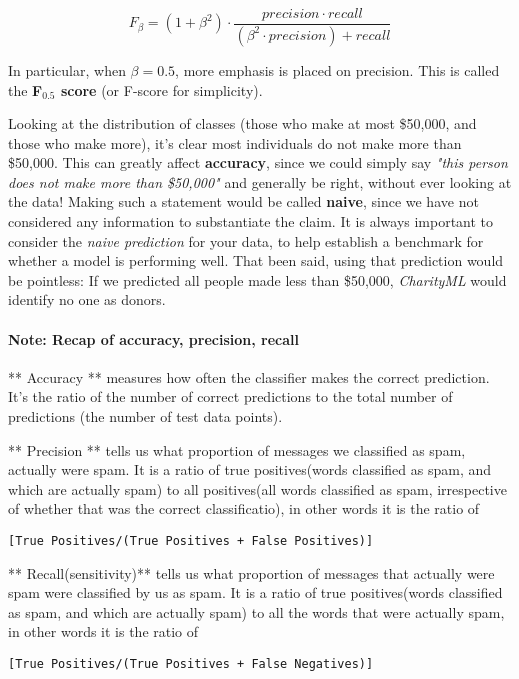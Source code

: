 \documentclass[11pt]{article}
\begin{document}
\[ F_{\beta} = (1 + \beta^2) \cdot \frac{precision \cdot recall}{\left( \beta^2 \cdot precision \right) + recall} \]

In particular, when \(\beta = 0.5\), more emphasis is placed on
precision. This is called the \textbf{F\(_{0.5}\) score} (or F-score for
simplicity).

Looking at the distribution of classes (those who make at most \$50,000,
and those who make more), it's clear most individuals do not make more
than \$50,000. This can greatly affect \textbf{accuracy}, since we could
simply say \emph{"this person does not make more than \$50,000"} and
generally be right, without ever looking at the data! Making such a
statement would be called \textbf{naive}, since we have not considered
any information to substantiate the claim. It is always important to
consider the \emph{naive prediction} for your data, to help establish a
benchmark for whether a model is performing well. That been said, using
that prediction would be pointless: If we predicted all people made less
than \$50,000, \emph{CharityML} would identify no one as donors.

\paragraph{Note: Recap of accuracy, precision,
recall}\label{note-recap-of-accuracy-precision-recall}

** Accuracy ** measures how often the classifier makes the correct
prediction. It's the ratio of the number of correct predictions to the
total number of predictions (the number of test data points).

** Precision ** tells us what proportion of messages we classified as
spam, actually were spam. It is a ratio of true positives(words
classified as spam, and which are actually spam) to all positives(all
words classified as spam, irrespective of whether that was the correct
classificatio), in other words it is the ratio of

\texttt{{[}True\ Positives/(True\ Positives\ +\ False\ Positives){]}}

** Recall(sensitivity)** tells us what proportion of messages that
actually were spam were classified by us as spam. It is a ratio of true
positives(words classified as spam, and which are actually spam) to all
the words that were actually spam, in other words it is the ratio of

\texttt{{[}True\ Positives/(True\ Positives\ +\ False\ Negatives){]}}
\end{document}
